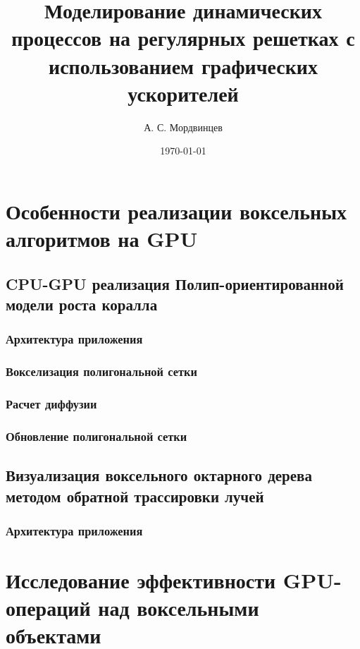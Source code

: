 \documentclass[a4paper,14pt]{extreport}
\begin{document}
\title{Моделирование динамических процессов на регулярных решетках с использованием графических ускорителей}
\author{А. С. Мордвинцев}
\date{\today}


\sloppy  %

\maketitle

\setcounter{page}{3}

\tableofcontents






\chapter{Особенности реализации воксельных алгоритмов на GPU}
\section{CPU-GPU реализация Полип-ориентированной модели роста коралла}
\subsection{Архитектура приложения}
\subsection{Вокселизация полигональной сетки}
\subsection{Расчет диффузии}
\subsection{Обновление полигональной сетки}
\section{Визуализация воксельного октарного дерева методом обратной трассировки лучей}
\subsection{Архитектура приложения}

\chapter{Исследование эффективности GPU-операций над воксельными объектами}
\end{document}
